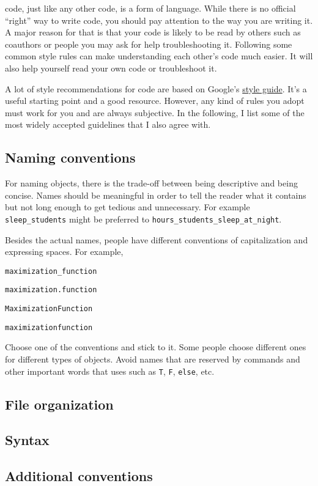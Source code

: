 \R code, just like any other code, is a form of language. While there is no official ``right'' way to write \R code, you should pay attention to the way you are writing it. A major reason for that is that your code is likely to be read by others such as coauthors or people you may ask for help troubleshooting it. Following some common style rules can make understanding each other's code much easier. It will also help yourself read your own code or troubleshoot it.

A lot of style recommendations for \R code are based on Google's \href{https://google.github.io/styleguide/Rguide.xml}{style guide}. It's a useful starting point and a good resource. However, any kind of rules you adopt must work for you and are always subjective. In the following, I list some of the most widely accepted guidelines that I also agree with.

\subsection{Naming conventions}

For naming objects, there is the trade-off between being descriptive and being concise. Names should be meaningful in order to tell the reader what it contains but not long enough to get tedious and unnecessary. For example \texttt{sleep\_students} might be preferred to \texttt{hours\_students\_sleep\_at\_night}.

Besides the actual names, people have different conventions of capitalization and expressing spaces. For example,

{\parindent40pt %
	{\small \texttt{maximization\_function}}
	
	{\small \texttt{maximization.function}}
	
	{\small \texttt{MaximizationFunction}}
	
	{\small \texttt{maximizationfunction}}
}

Choose one of the conventions and stick to it. Some people choose different ones for different types of objects. Avoid names that are reserved by \R commands and other important words that \R uses such as \texttt{T}, \texttt{F}, \texttt{else}, etc. 

\subsection{File organization}

\subsection{Syntax}

\subsection{Additional conventions}